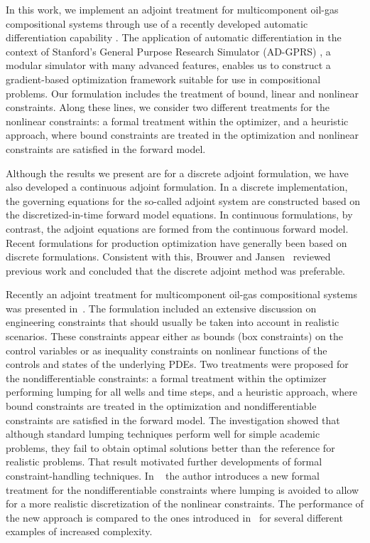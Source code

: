 In this work, we implement an adjoint treatment for multicomponent oil-gas
compositional systems through use of a recently developed automatic
differentiation capability \citep{Younis:2010}. The application of automatic
differentiation in the context of Stanford's General Purpose Research Simulator
(AD-GPRS) \citep{Cao:Thesis}, a modular simulator with many advanced features,
enables us to construct a gradient-based optimization framework suitable for
use in compositional problems. Our formulation includes the treatment of
bound, linear and nonlinear constraints. Along these lines, we consider two
different treatments for the nonlinear constraints: a formal treatment within
the optimizer, and a heuristic approach, where bound constraints are treated in the optimization and nonlinear constraints are satisfied in the forward model.


Although the results we present are for a discrete adjoint formulation,
we have also developed a continuous adjoint formulation. In a discrete
implementation, the governing equations for the so-called adjoint
system are constructed based on the discretized-in-time forward model
equations. In continuous formulations, by contrast, the adjoint
equations are formed from the continuous forward model. Recent
formulations for production optimization have generally been based on
discrete formulations. Consistent with this, Brouwer and Jansen~\citep{Brouwer:2004}
reviewed previous work and concluded that the discrete adjoint method
was preferable.



Recently an adjoint treatment for multicomponent oil-gas
compositional systems was presented in~\citep{Kourounis2014}. 
The formulation included an extensive discussion on engineering
constraints that should usually be taken into account in realistic scenarios. 
These constraints appear either as bounds (box constraints) 
on the control variables or as inequality constraints on 
nonlinear functions of the controls and states of the underlying PDEs.
 Two treatments were proposed for the nondifferentiable constraints: a formal treatment within
the optimizer performing lumping for all wells and time steps, and a heuristic approach,
where bound constraints are treated in the optimization and nondifferentiable 
constraints are satisfied in the forward model. The investigation showed that although standard
lumping techniques perform well for simple academic problems, they fail 
to obtain optimal solutions better than the reference for realistic problems.
That result motivated further developments of formal constraint-handling techniques.
In ~\citep{Kourounis2015} the author introduces a new formal treatment for the nondifferentiable 
constraints where lumping is avoided to allow for a more realistic discretization
of the nonlinear constraints. The performance of the new approach is compared to
the ones introduced in~\citep{Kourounis2014} for several different examples
of increased complexity.



\endinput
